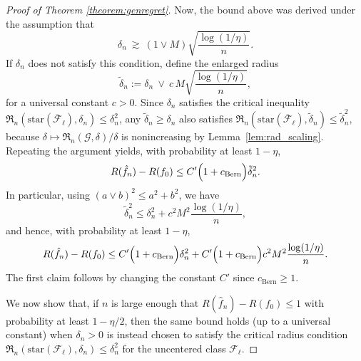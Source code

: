 \documentclass[10pt,a4paper]{amsart}
\begin{document}
\begin{proof}[Proof of Theorem \ref{theorem:genregret}]
Now, the bound above was derived under the assumption that
\[
\delta_n \ \gtrsim\ (1 \vee M) \sqrt{\frac{\log(1/\eta)}{n}}.
\]
If \(\delta_n\) does not satisfy this condition, define the enlarged radius
\[
\tilde\delta_n := \delta_n \ \vee\ c\,M\sqrt{\frac{\log(1/\eta)}{n}},
\]
for a universal constant \(c>0\). Since \(\delta_n\) satisfies the critical inequality
\(\mathfrak{R}_n(\mathrm{star}(\overline{\mathcal{F}}_{\ell}),\delta_n)\le \delta_n^2\), any
\(\tilde\delta_n\ge \delta_n\) also satisfies
\(\mathfrak{R}_n(\mathrm{star}(\overline{\mathcal{F}}_{\ell}),\tilde\delta_n)\le \tilde\delta_n^2\),
because \(\delta \mapsto \mathfrak{R}_n(\mathcal{G},\delta)/\delta\) is nonincreasing by
Lemma~\ref{lem:rad_scaling}. Repeating the argument yields, with probability at least \(1-\eta\),
\[
R(\hat f_n)-R(f_0)
\le
C'\Bigl(1+c_{\mathrm{Bern}}\Bigr)\tilde\delta_n^2.
\]
In particular, using \((a\vee b)^2\le a^2+b^2\), we have
\[
\tilde\delta_n^2
\le
\delta_n^2 + c^2 M^2\frac{\log(1/\eta)}{n},
\]
and hence, with probability at least \(1-\eta\),
\[
R(\hat f_n)-R(f_0)
\le
C'\Bigl(1+c_{\mathrm{Bern}}\Bigr)\delta_n^2
+
C'\Bigl(1+c_{\mathrm{Bern}}\Bigr)c^2 M^2\frac{\log(1/\eta)}{n}.
\]
The first claim follows by changing the constant $C'$ since $c_{\mathrm{Bern}} \geq 1$.



We now show that, if \(n\) is large enough that \(R(\hat f_n)-R(f_0)\le 1\) with probability
at least \(1-\eta/2\), then the same bound holds (up to a universal constant) when \(\delta_n>0\)
is instead chosen to satisfy the critical radius condition
\(\mathfrak{R}_n(\mathrm{star}(\mathcal{F}_{\ell}),\delta_n)\le \delta_n^2\) for the uncentered
class \(\mathcal{F}_{\ell}\).


\end{proof}
\end{document}
